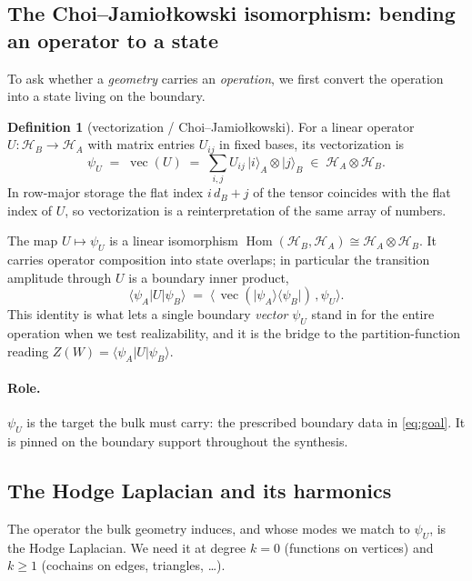 \documentclass[11pt]{article}
\DeclareMathOperator{\vecop}{vec}
\DeclareMathOperator{\Hom}{Hom}
\newcommand{\HH}{\mathcal{H}}
\newcommand{\ket}[1]{\lvert #1 \rangle}
\newcommand{\bra}[1]{\langle #1 \rvert}
\newcommand{\inner}[2]{\langle #1, #2 \rangle}
\theoremstyle{definition}
\newtheorem{definition}{Definition}[section]
\theoremstyle{plain}
\begin{document}
\subsection{The Choi--Jamio\l{}kowski isomorphism: bending an operator to a state}
\label{sec:choi}

To ask whether a \emph{geometry} carries an \emph{operation}, we first convert the
operation into a state living on the boundary.

\begin{definition}[vectorization / Choi--Jamio\l{}kowski]
For a linear operator $U:\HH_B\to\HH_A$ with matrix entries $U_{ij}$ in fixed bases, its
vectorization is
\begin{equation}
\psi_U \;=\; \vecop(U)\;=\;\sum_{i,j} U_{ij}\,\ket{i}_A\otimes\ket{j}_B \;\in\; \HH_A\otimes\HH_B .
\end{equation}
In row-major storage the flat index $i\,d_B+j$ of the tensor coincides with the flat index
of $U$, so vectorization is a reinterpretation of the same array of numbers.
\end{definition}

The map $U\mapsto\psi_U$ is a linear isomorphism $\Hom(\HH_B,\HH_A)\cong\HH_A\otimes\HH_B$.
It carries operator composition into state overlaps; in particular the transition amplitude
through $U$ is a boundary inner product,
\begin{equation}
\bra{\psi_A}U\ket{\psi_B}\;=\;\inner{\,\vecop(\ket{\psi_A}\bra{\psi_B})\,}{\psi_U}.
\label{eq:transition}
\end{equation}
This identity is what lets a single boundary \emph{vector} $\psi_U$ stand in for the entire
operation when we test realizability, and it is the bridge to the partition-function reading
$Z(W)=\bra{\psi_A}U\ket{\psi_B}$.

\paragraph{Role.} $\psi_U$ is the target the bulk must carry: the prescribed boundary data
in \eqref{eq:goal}. It is pinned on the boundary support throughout the synthesis.

\subsection{The Hodge Laplacian and its harmonics}
\label{sec:hodge}

The operator the bulk geometry induces, and whose modes we match to $\psi_U$, is the Hodge
Laplacian. We need it at degree $k=0$ (functions on vertices) and $k\ge1$ (cochains on
edges, triangles, \dots).
\end{document}

